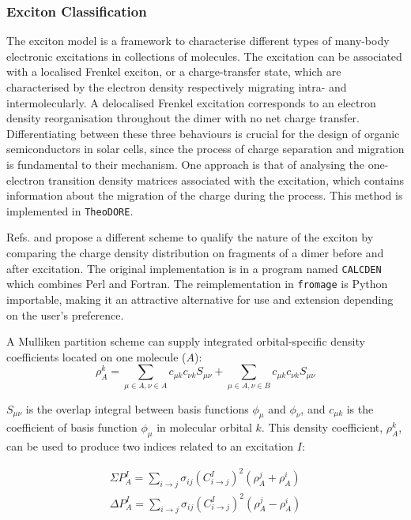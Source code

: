 \subsubsection{Exciton Classification}

The exciton model is a framework to characterise different types of many-body electronic excitations in collections of molecules. The excitation can be associated with a localised Frenkel exciton, or a charge-transfer state, which are characterised by the electron density respectively migrating intra- and intermolecularly. A delocalised Frenkel excitation corresponds to an electron density reorganisation throughout the dimer with no net charge transfer. Differentiating between these three behaviours is crucial for the design of organic semiconductors in solar cells, since the process of charge separation and migration is fundamental to their mechanism. One approach is that of analysing the one-electron transition density matrices associated with the excitation, which contains information about the migration of the charge during the process.\cite{Plasser2012} This method is implemented in \texttt{TheoDORE}.\cite{plasser2017theodore}

Refs.  and  propose a different scheme to qualify the nature of the exciton by comparing the charge density distribution on fragments of a dimer before and after excitation. The original implementation is in a program named \texttt{CALCDEN} which combines Perl and Fortran. The reimplementation in \texttt{fromage} is Python importable, making it an attractive alternative for use and extension depending on the user's preference.

A Mulliken partition scheme can supply integrated orbital-specific density coefficients located on one molecule ($A$):
\begin{equation}
    \rho^k_A = \sum_{\mu \in A, \nu \in A} c_{\mu k} c_{\nu k} S_{\mu \nu} + \sum_{\mu \in A, \nu \in B} c_{\mu k} c_{\nu k} S_{\mu \nu}
\end{equation}

$S_{\mu \nu}$ is the overlap integral between basis functions $\phi_{\mu}$ and $\phi_{\nu}$, and $c_{\mu k}$ is the coefficient of basis function $\phi_{\mu}$ in molecular orbital $k$. This density coefficient, $\rho^k_A$, can be used to produce two indices related to an excitation $I$:

\begin{equation}
\begin{split}
    \Sigma P^I_A = \sum_{i\rightarrow{}j} \sigma_{ij} (C^I_{i\rightarrow{}j})^2(\rho^j_A + \rho^i_A)\\
    \Delta P^I_A = \sum_{i\rightarrow{}j} \sigma_{ij} (C^I_{i\rightarrow{}j})^2(\rho^j_A - \rho^i_A)
\end{split}
\label{eq:exciton}
\end{equation}

